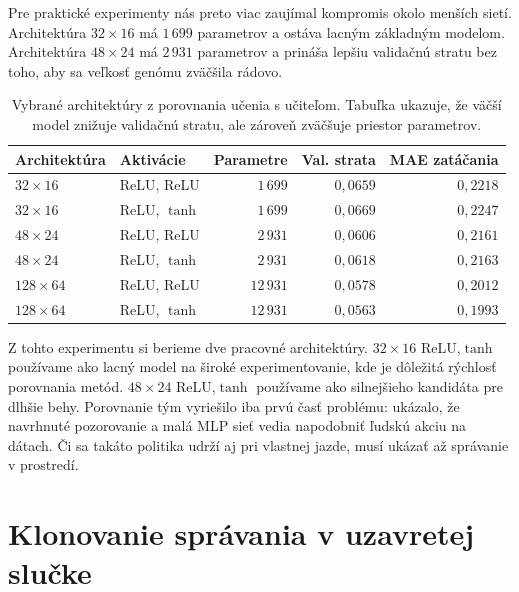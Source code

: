 Pre praktické experimenty nás preto viac zaujímal kompromis okolo menších sietí. Architektúra \(32\times16\) má \(1\,699\) parametrov a ostáva lacným základným modelom. Architektúra \(48\times24\) má \(2\,931\) parametrov a prináša lepšiu validačnú stratu bez toho, aby sa veľkosť genómu zväčšila rádovo.

\begin{table}[htbp]
    \centering
    \small
    \renewcommand{\arraystretch}{1.12}
    \caption[Vybrané architektúry z porovnania]{Vybrané architektúry z porovnania učenia s učiteľom. Tabuľka ukazuje, že väčší model znižuje validačnú stratu, ale zároveň zväčšuje priestor parametrov.}
    \label{tab:supervised_architecture_candidates}
    \begin{tabular}{llrrr}
        \toprule
        Architektúra & Aktivácie & Parametre & Val. strata & MAE zatáčania \\
        \midrule
        \(32\times16\) & ReLU, ReLU & \(1\,699\) & \(0{,}0659\) & \(0{,}2218\) \\
        \(32\times16\) & ReLU, \(\tanh\) & \(1\,699\) & \(0{,}0669\) & \(0{,}2247\) \\
        \(48\times24\) & ReLU, ReLU & \(2\,931\) & \(0{,}0606\) & \(0{,}2161\) \\
        \(48\times24\) & ReLU, \(\tanh\) & \(2\,931\) & \(0{,}0618\) & \(0{,}2163\) \\
        \(128\times64\) & ReLU, ReLU & \(12\,931\) & \(0{,}0578\) & \(0{,}2012\) \\
        \(128\times64\) & ReLU, \(\tanh\) & \(12\,931\) & \(0{,}0563\) & \(0{,}1993\) \\
        \bottomrule
    \end{tabular}
\end{table}

Z tohto experimentu si berieme dve pracovné architektúry. \(32\times16\) ReLU,\(\tanh\) používame ako lacný model na široké experimentovanie, kde je dôležitá rýchlosť porovnania metód. \(48\times24\) ReLU,\(\tanh\) používame ako silnejšieho kandidáta pre dlhšie behy. Porovnanie tým vyriešilo iba prvú časť problému: ukázalo, že navrhnuté pozorovanie a malá MLP sieť vedia napodobniť ľudskú akciu na dátach. Či sa takáto politika udrží aj pri vlastnej jazde, musí ukázať až správanie v prostredí.

\FloatBarrier

\section{Klonovanie správania v uzavretej slučke}

